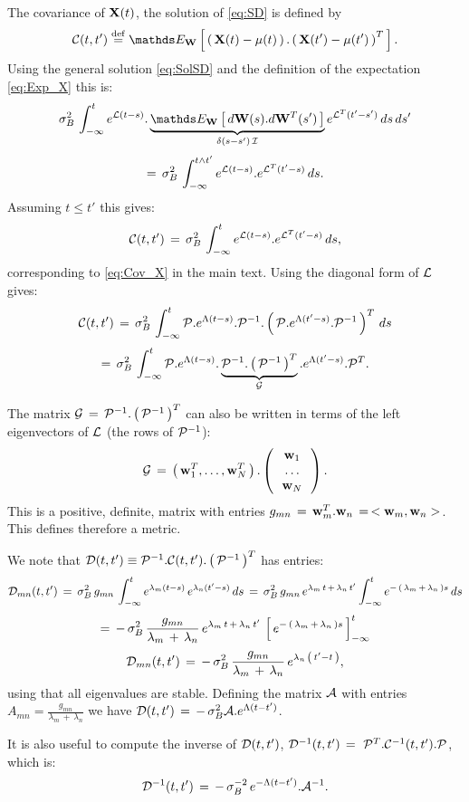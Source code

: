\documentclass{article}
\begin{document}
The covariance of  $\bold{X}(t)$, the solution of \eqref{eq:SD} is defined by
%
$$
\cC(t,t') \deq \Exp{\vW}{\pare{\vX(t)-\mu(t)}.\pare{\vX(t')-\mu(t')}^T}.
$$
%
Using the general solution \eqref{eq:SolSD} and the definition of the expectation \eqref{eq:Exp_X} this is:
%
$$
\sigma_B^2 \, \int_{-\infty}^t e^{\cL(t-s)}.\underbrace{\Exp{\vW}{d\vW(s).d\vW^T(s')}}_{\delta(s-s')\,\cI}e^{\cLT(t'-s')} \,ds\,ds'
$$
%
$$
=\,\sigma_B^2 \, \int_{-\infty}^{t \wedge t'} e^{{\mathcal L}(t-s)}.e^{{\mathcal L}^T(t'-s)} \,ds.
$$
%
Assuming $t\leq t'$ this gives:
%
$$
{\mathcal C}(t,t')  \,=\, \sigma_B^2 \, \int_{-\infty}^t e^{{\mathcal L}(t-s)}.e^{{\mathcal L}^T(t'-s)} \, ds, 
$$
%
corresponding to \eqref{eq:Cov_X} in the main text.
Using the diagonal form of ${\mathcal L}$ gives:
%
$$
{\mathcal C}(t,t')  \,=\, \sigma_B^2 \, \int_{-\infty}^t {\mathcal P}.e^{\Lambda(t-s)}.{\mathcal P}^{-1}. \left(\, {\mathcal P}.e^{\Lambda(t'-s)}.{\mathcal P}^{-1} \, \right)^T\, ds
$$
%
$$
=\, \sigma_B^2 \, \int_{-\infty}^t  {\mathcal P}.e^{\Lambda(t-s)}.\underbrace{{\mathcal P}^{-1}.\left(\, {\mathcal P}^{-1} \, \right)^T}_{{\mathcal G}}.e^{\Lambda(t'-s)}.{\mathcal P}^T.
$$

The matrix ${\mathcal G}\,=\,{\mathcal P}^{-1}.\left(\, {\mathcal P}^{-1} \, \right)^T$ can also be written in terms of the left eigenvectors of ${\mathcal L}$ (the rows of ${\mathcal P}^{-1}$):
%
$$
{\mathcal G} \,=\, \left(\, \bold{w}^T_1, \dots, \bold{w}^T_N \, \right).\left(\, \begin{array}{ccc}\bold{w}_1\\\dots\\\bold{w}_N\end{array} \, \right).
$$
%
This is a positive, definite, matrix with entries
%
$g_{mn}\,=\,\bold{w}^T_m.\bold{w}_n\,=\,<\bold{w}_m,\bold{w}_n>$.
%
This defines therefore a metric. 

We note that ${\mathcal D}(t,t') \equiv {\mathcal P}^{-1}.{\mathcal C}(t,t').\left(\, {\mathcal P}^{-1} \, \right)^T$
has entries:
%
$$
{\mathcal D}_{mn}(t,t') \,=\, \sigma_B^2 \,g_{mn} \,  \int_{-\infty}^t e^{\lambda_m(t-s)}\,e^{\lambda_n(t'-s)}\, ds
\,=\, \sigma_B^2 \,g_{mn} \, e^{\lambda_m \, t \,+\, \lambda_n \, t'} \int_{-\infty}^t 
e^{-\,\left(\, \lambda_m \,+\, \lambda_n \, \right)s} \, ds
$$
$$
=\, - \, \sigma_B^2 \, \frac{g_{mn}}{\lambda_m \,+\, \lambda_n} \, e^{\lambda_m \, t \,+\, \lambda_n \, t'} \, 
\left[\, e^{-\,\left(\, \lambda_m \,+\, \lambda_n \, \right)s} \, \right]_{-\infty}^t
$$ 
%
$$
{\mathcal D}_{mn}(t,t') \,=\,  
- \, \sigma_B^2 \, \frac{g_{mn}}{\lambda_m \,+\, \lambda_n} \, e^{\lambda_n \, \left(\, t'-t \, \right)},
$$
using that all eigenvalues are stable. Defining the matrix ${\mathcal A}$ with entries $A_{mn}=\frac{g_{mn}}{\lambda_m \,+\, \lambda_n}$ we have
${\mathcal D}(t,t') \,=\,- \, \sigma_B^2 {\mathcal A}.e^{\Lambda(t-t')}$.

It is also useful to compute the inverse of ${\mathcal D}(t,t')$, $\cD^{-1}(t,t')\,=\ \cP^T.\cC^{-1}(t,t').\cP$, which is:
%
\begin{equation}\label{eq:Dmoins1}
{\mathcal D}^{-1}(t,t') \,=\, - \, \sigma_B^{-2} \, e^{-\Lambda(t-t')}.{\mathcal A}^{-1}.
\end{equation} 
\end{document}
